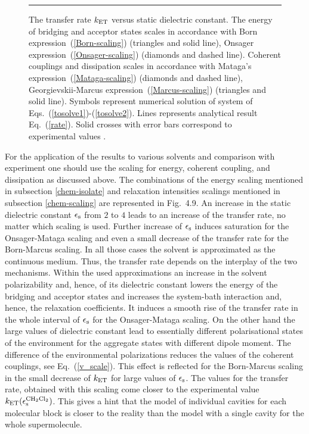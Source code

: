 \documentclass[12pt,twoside,a4paper]{report}
\begin{document}
\footnotesize\begin{figure}[!h]\centering
  \parbox{6cm}
  {\rule{-3cm}{0cm}
\epsfxsize=10cm}
\caption[The transfer rate $k_{\rm ET}$ versus static  dielectric
  constant]
  {\small 
  \label{chem:solvent}
  The transfer rate $k_{\rm ET}$ versus static dielectric
  constant.  The energy of bridging and acceptor states scales in accordance with 
  Born               expression~(\ref{Born-scaling})    (triangles and solid line), 
  Onsager            expression~(\ref{Onsager-scaling}) (diamonds and dashed line).  
  Coherent couplings and dissipation scales in accordance with 
  Mataga's           expression~(\ref{Mataga-scaling})  (diamonds and dashed line),
  Georgievskii-Marcus expression~(\ref{Marcus-scaling})  (triangles and solid line).  
  Symbols represent numerical
  solution of system of Eqs.~(\ref{tosolve1})-(\ref{tosolve2}).  Lines represents
  analytical result Eq.~(\ref{rate}).  Solid crosses with error bars 
  correspond to experimental values \protect \cite{r4}.}
\end{figure}\normalsize 

For the application of the results to various solvents and comparison
with experiment one should use the scaling for energy, coherent
coupling, and dissipation as discussed above.  The combinations of the
energy scaling mentioned in subsection \ref{chem-isolate} and relaxation intensities
scalings mentioned in subsection \ref{chem-scaling} are represented in 
Fig.~4.9.
An increase in the static dielectric constant $\epsilon_{\rm s}$ 
from $2$ to $4$ leads to an increase of the transfer rate, no matter
which scaling is used.  Further increase of $\epsilon_{\rm s}$
induces saturation for the Onsager-Mataga scaling and even 
a small decrease of the transfer rate for the Born-Marcus scaling.  
In all those cases
the solvent is approximated as the continuous medium.  
Thus, the transfer rate depends on the interplay of the two mechanisms.
Within the used approximations an
increase in the solvent polarizability and, hence, of its
dielectric constant lowers the energy of the bridging and acceptor states and
increases the system-bath interaction and, hence, the
relaxation coefficients.  
It induces a smooth rise of the transfer rate in the whole interval 
of $\epsilon_{\rm s}$ for the Onsager-Mataga scaling. 
On the other hand  the large values of dielectric constant 
lead to essentially different polarisational states of the environment
for the aggregate states with different dipole moment.
The difference of the environmental polarizations reduces the
values of the coherent couplings, see Eq.~(\ref{v_scale}). 
This effect is reflected for the Born-Marcus scaling 
in the small decrease of $k_{\rm ET}$ for large values of $\epsilon_{\rm s}$. 
The values for the transfer rate, obtained with this
scaling come closer to the experimental value 
$k_{\rm  ET}(\epsilon_{\rm s}^{\rm CH_2Cl_2})$. 
This gives a hint
that the model of individual cavities for each molecular block is
closer to the reality than the model with a single cavity
for the whole supermolecule.
\end{document}
